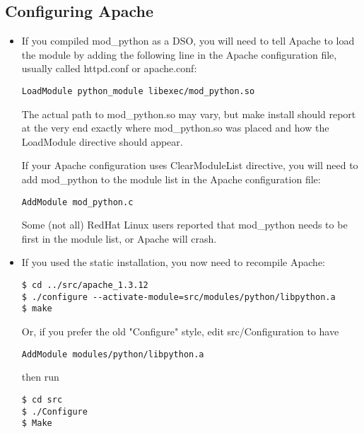\subsection{Configuring Apache\label{inst-apacheconfig}}

\begin{itemize}

\item
If you compiled mod_python as a DSO, you will need to tell Apache to
load the module by adding the following line in the Apache
configuration file, usually called httpd.conf or apache.conf:

\begin{verbatim}
LoadModule python_module libexec/mod_python.so
\end{verbatim}

The actual path to mod_python.so may vary, but make install should
report at the very end exactly where mod_python.so was placed and how
the LoadModule directive should appear.

If your Apache configuration uses ClearModuleList directive, you will
need to add mod_python to the module list in the Apache configuration
file:

\begin{verbatim}
AddModule mod_python.c
\end{verbatim}

Some (not all) RedHat Linux users reported that mod_python needs to be
first in the module list, or Apache will crash.

\item
If you used the static installation, you now need to recompile Apache: 

\begin{verbatim}
$ cd ../src/apache_1.3.12
$ ./configure --activate-module=src/modules/python/libpython.a
$ make
\end{verbatim}
                            
Or, if you prefer the old "Configure" style, edit src/Configuration to have 

\begin{verbatim}
AddModule modules/python/libpython.a
\end{verbatim}
then run 
\begin{verbatim}
$ cd src
$ ./Configure
$ Make
\end{verbatim}

\end{itemize}

